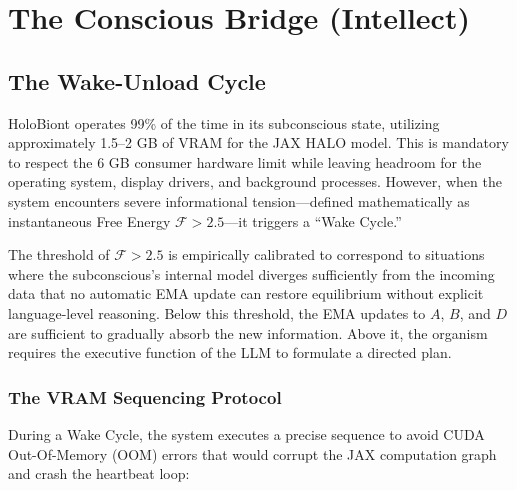 \chapter{The Conscious Bridge (Intellect)}

\section{The Wake-Unload Cycle}

HoloBiont operates 99\% of the time in its subconscious state, utilizing approximately 1.5--2 GB of VRAM for the JAX HALO model. This is mandatory to respect the 6 GB consumer hardware limit while leaving headroom for the operating system, display drivers, and background processes. However, when the system encounters severe informational tension---defined mathematically as instantaneous Free Energy $\mathcal{F} > 2.5$---it triggers a ``Wake Cycle.''

The threshold of $\mathcal{F} > 2.5$ is empirically calibrated to correspond to situations where the subconscious's internal model diverges sufficiently from the incoming data that no automatic EMA update can restore equilibrium without explicit language-level reasoning. Below this threshold, the EMA updates to $A$, $B$, and $D$ are sufficient to gradually absorb the new information. Above it, the organism requires the executive function of the LLM to formulate a directed plan.

\subsection{The VRAM Sequencing Protocol}

During a Wake Cycle, the system executes a precise sequence to avoid CUDA Out-Of-Memory (OOM) errors that would corrupt the JAX computation graph and crash the heartbeat loop:

